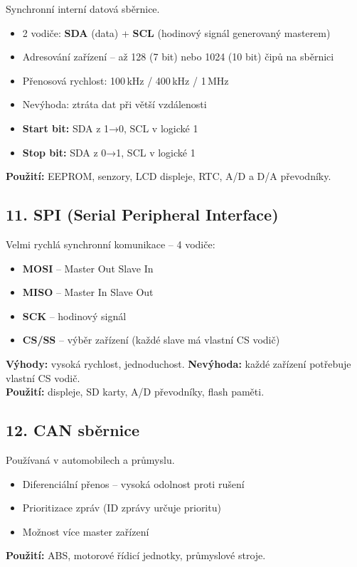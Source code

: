 \documentclass[a4paper,10pt]{article}
\begin{document}
\begin{vysvetlenibox}
Synchronní interní datová sběrnice.

\begin{itemize}
  \item 2 vodiče: \textbf{SDA} (data) + \textbf{SCL} (hodinový signál generovaný masterem)
  \item Adresování zařízení – až 128 (7 bit) nebo 1024 (10 bit) čipů na sběrnici
  \item Přenosová rychlost: 100\,kHz / 400\,kHz / 1\,MHz
  \item Nevýhoda: ztráta dat při větší vzdálenosti
  \item \textbf{Start bit:} SDA z 1→0, SCL v logické 1
  \item \textbf{Stop bit:} SDA z 0→1, SCL v logické 1
\end{itemize}
\textbf{Použití:} EEPROM, senzory, LCD displeje, RTC, A/D a D/A převodníky.

\subsection*{11. SPI (Serial Peripheral Interface)}

Velmi rychlá synchronní komunikace – 4 vodiče:
\begin{itemize}
  \item \textbf{MOSI} – Master Out Slave In
  \item \textbf{MISO} – Master In Slave Out
  \item \textbf{SCK} – hodinový signál
  \item \textbf{CS/SS} – výběr zařízení (každé slave má vlastní CS vodič)
\end{itemize}
\textbf{Výhody:} vysoká rychlost, jednoduchost. \quad \textbf{Nevýhoda:} každé zařízení potřebuje vlastní CS vodič.\\
\textbf{Použití:} displeje, SD karty, A/D převodníky, flash paměti.

\subsection*{12. CAN sběrnice}

Používaná v automobilech a průmyslu.

\begin{itemize}
  \item Diferenciální přenos – vysoká odolnost proti rušení
  \item Prioritizace zpráv (ID zprávy určuje prioritu)
  \item Možnost více master zařízení
\end{itemize}
\textbf{Použití:} ABS, motorové řídicí jednotky, průmyslové stroje.


\end{vysvetlenibox}
\end{document}
